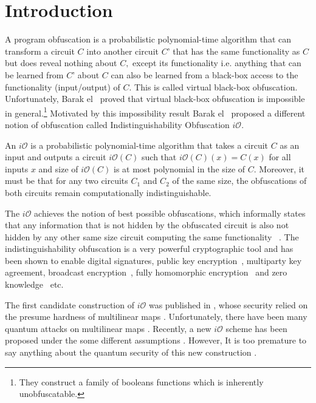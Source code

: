 \section{Introduction}
A program obfuscation is a probabilistic polynomial-time algorithm that can transform a circuit $C$ into another circuit $C’$ that has the same functionality as $C$ but does reveal nothing about $C,$ except its functionality i.e. anything that can be learned from $C’$ about $C$ can also be learned from a black-box access to the functionality (input/output) of $C.$ This is called virtual black-box obfuscation. Unfortunately, Barak el~\cite{BGI+12}  proved that virtual black-box obfuscation is impossible in general.\footnote{They construct a family of booleans functions which is inherently unobfuscatable.} Motivated by this impossibility result Barak el~\cite{BGI+12} proposed a different notion of obfuscation called Indistinguishability Obfuscation $i\mathcal{O}.$ 

An $i\mathcal{O}$ is a probabilistic polynomial-time algorithm that takes a circuit $C$ as an input and outputs a circuit $i\mathcal{O}(C)$ such that $i\mathcal{O}(C)(x)=C(x)$ for all inputs $x$ and size of $i\mathcal{O}(C)$ is at most polynomial in the size of $C.$ Moreover, it must be that for any two circuits $C_1$ and $C_2$ of the same size, the obfuscations of both circuits remain computationally indistinguishable.

 The $i\mathcal{O}$ achieves the notion of best possible obfuscations, which informally states that any information that is not hidden by the obfuscated circuit is also not hidden by any other same size circuit computing the same functionality ~\cite{GR14}. The indistinguishability obfuscation is a very powerful cryptographic tool and has been shown to enable digital signatures, public key encryption~\cite{SW14}, multiparty key agreement, broadcast encryption~\cite{BZ14}, fully homomorphic encryption~\cite{CLTV15} and zero knowledge~\cite{BP15} etc. 

The first candidate construction of $i\mathcal{O}$ was published in \cite{GGH+13}, whose security relied on the presume hardness of multilinear maps \cite{CLT13, LSS14, GGH15}. Unfortunately, there have been many quantum attacks on multilinear maps \cite{ABD16, CDPR16, CGH17}.  Recently, a new $i\mathcal{O}$ scheme has been proposed under the some different assumptions \cite{AJL+19}. However, It is too premature to say anything about the quantum security of this new construction \cite{AJL+19}. 

